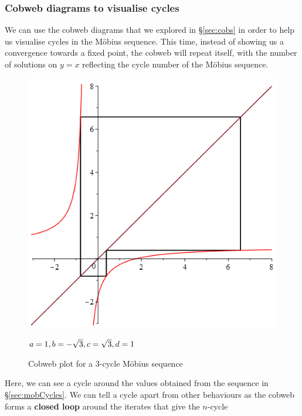 \documentclass[12pt]{article}
\begin{document}
\subsubsection{Cobweb diagrams to visualise cycles}
We can use the cobweb diagrams that we explored in \S\ref{sec:cobs} in order to help us visualise cycles in the Möbius sequence. This time, instead of showing us a convergence towards a fixed point, the cobweb will repeat itself, with the number of solutions on $y=x$ reflecting the cycle number of the Möbius sequence. 
	\begin{figure}[H]
		\begin{minipage}{0.725\textwidth}
			\hfill
			\includegraphics[scale=0.4]{mobCob3.png}
		\end{minipage}
	\hfill
		\begin{minipage}{0.2\textwidth}
			$a=1,\\b=-\sqrt{3},\\ c=\sqrt{3},\\ d=1\\$
		\end{minipage}
	\caption{Cobweb plot for a 3-cycle Möbius sequence}
	\label{fig:mobAsmp}
	\end{figure}
\noindent Here, we can see a cycle around the values obtained from the sequence in \S\ref{sec:mobCycles}. We can tell a cycle apart from other behaviours as the cobweb forms a \textbf{closed loop} around the iterates that give the $n$-cycle
\newpage
\end{document}

